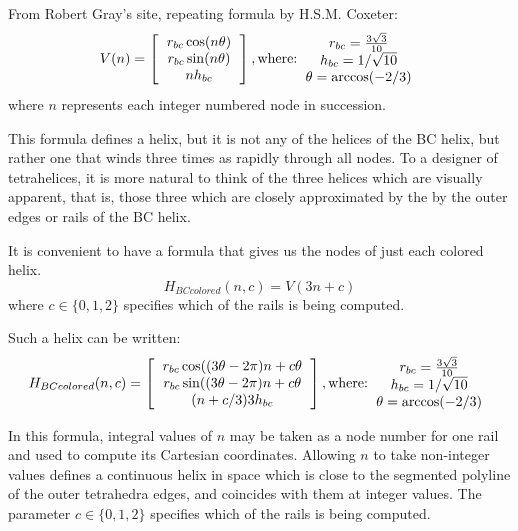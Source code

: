 \documentclass[11pt]{article}
\begin{document}
From Robert Gray's site, repeating formula by H.S.M. Coxeter:
\[
V(n) =
\left [
  \begin{tabular}{c}
   $ r_{bc} \cos(n \theta) $\\
   $ r_{bc} \sin(n \theta) $\\
   $ n h_{bc}  $
  \end{tabular}
  \right ],
\text{where:}
  \begin{tabular}{c}
 $ r_{bc} = \frac{3\sqrt{3}}{10} $\\
 $ h_{bc} = 1/\sqrt{10} $ \\
 $ \theta = \arccos(-2/3) $ \\
  \end{tabular}      
\]
where $n$ represents each integer numbered node in succession.

This formula defines a helix, but it is not any of the helices of the BC helix, but rather one that winds three times
as rapidly through all nodes. To a designer of tetrahelices, it is more natural to think of the three helices which
are visually apparent, that is, those three which are closely approximated by the by the outer edges or rails of the BC helix.

It is convenient to have a formula that gives us the nodes of just
each colored helix.
\[
H_{BCcolored}(n,c) = V(3n +c)
\]
where $c \in \{0,1,2\}$ specifies which of the rails is being computed.

Such a helix can be written:
\[
H_{BCcolored}(n,c) =
\left [
  \begin{tabular}{c}
   $ r_{bc}  \cos((3 \theta - 2 \pi)n + c  \theta $\\
   $ r_{bc} \sin((3 \theta - 2 \pi)n + c  \theta $\\
   $ (n + c/3) 3  h_{bc} $
  \end{tabular}
  \right ],
\text{where:}
  \begin{tabular}{c}
 $ r_{bc} = \frac{3\sqrt{3}}{10} $\\
 $ h_{bc} = 1/\sqrt{10} $ \\
 $ \theta = \arccos(-2/3) $ \\
  \end{tabular}      
  \]

In this formula, integral values of $n$ may be taken as a node number for one rail and used to compute its Cartesian
coordinates. Allowing $n$ to take non-integer values defines a continuous
helix in space which is close to the segmented polyline of the outer tetrahedra edges, and coincides with them at integer
values.
The parameter $c \in \{0,1,2\}$ specifies which of the rails is being computed.
\end{document}
